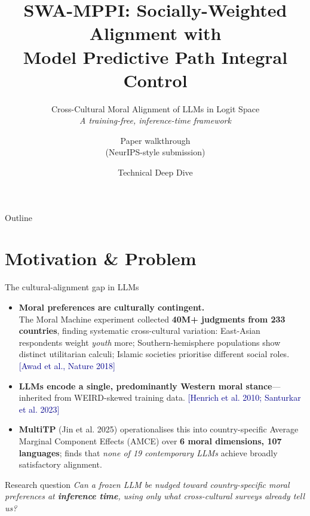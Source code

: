 \documentclass[10pt,aspectratio=169]{beamer}
\title[SWA-MPPI]{SWA-MPPI: Socially-Weighted Alignment with\\
Model Predictive Path Integral Control}
\subtitle{Cross-Cultural Moral Alignment of LLMs in Logit Space\\[0.2em]
\small\textit{A training-free, inference-time framework}}
\author[Paper deep-dive]{Paper walkthrough\\\footnotesize (NeurIPS-style submission)}
\institute[]{\footnotesize Source: \texttt{SWA\_MPPI\_paper/paper\_revised.tex}}
\date{\small Technical Deep Dive}
\newcommand{\cit}[1]{{\scriptsize\textcolor{darkblue}{[#1]}}}
\begin{document}
\begin{frame}
  \titlepage
\end{frame}

\begin{frame}{Outline}
  \tableofcontents
\end{frame}

\section{Motivation \& Problem}

\begin{frame}{The cultural-alignment gap in LLMs}
  \begin{itemize}
    \item \textbf{Moral preferences are culturally contingent.}\\
          The Moral Machine experiment collected \textbf{40M+ judgments from 233 countries}, finding systematic cross-cultural variation: East-Asian respondents weight \emph{youth} more; Southern-hemisphere populations show distinct utilitarian calculi; Islamic societies prioritise different social roles. \cit{Awad et al., Nature 2018}
    \item \textbf{LLMs encode a single, predominantly Western moral stance}---inherited from WEIRD-skewed training data. \cit{Henrich et al. 2010; Santurkar et al. 2023}
    \item \textbf{MultiTP} (Jin et al. 2025) operationalises this into country-specific Average Marginal Component Effects (AMCE) over \textbf{6 moral dimensions, 107 languages}; finds that \emph{none of 19 contemporary LLMs} achieve broadly satisfactory alignment.
  \end{itemize}
  \begin{block}{Research question}
    \emph{Can a frozen LLM be nudged toward country-specific moral preferences at \textbf{inference time}, using only what cross-cultural surveys already tell us?}
  \end{block}
\end{frame}
\end{document}
